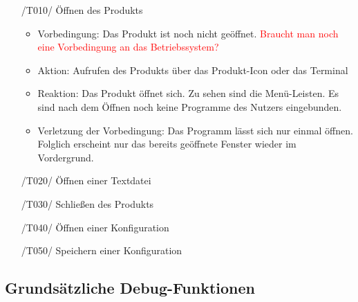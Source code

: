 \documentclass[parskip=full]{scrartcl}
\newcommand\frage[1]{\textcolor{red}{#1}}
\begin{document}
\begin{itemize}
	\item[/T010/] Öffnen des Produkts
	\begin{itemize}
		\item Vorbedingung: Das Produkt ist noch nicht geöffnet.
		\frage{Braucht man noch eine Vorbedingung an das Betriebssystem?}
		\item Aktion: Aufrufen des Produkts über das Produkt-Icon oder das Terminal
		\item Reaktion: Das Produkt öffnet sich. Zu sehen sind die Menü-Leisten. Es sind nach dem Öffnen noch keine Programme des Nutzers eingebunden.
		\item Verletzung der Vorbedingung: Das Programm lässt sich nur einmal öffnen. Folglich erscheint nur das bereits geöffnete Fenster wieder im Vordergrund.
	\end{itemize}
	
	\item[/T020/] Öffnen einer Textdatei

	\item[/T030/] Schließen des Produkts
	\item[/T040/] Öffnen einer Konfiguration
	\item[/T050/] Speichern einer Konfiguration
	
	\end{itemize}

\subsection{Grundsätzliche Debug-Funktionen}
\end{document}
